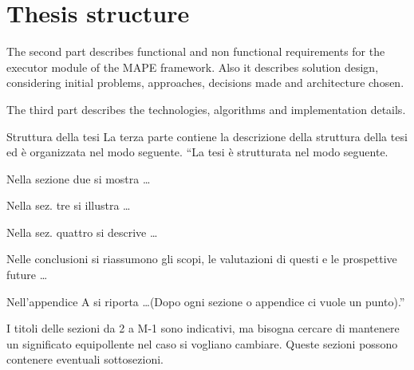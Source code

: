 \section{Thesis structure}
The second part describes functional and non functional requirements for the executor module of the MAPE framework.
Also it describes solution design, considering initial problems, approaches, decisions made and architecture chosen.

The third part describes the technologies, algorithms and implementation details.

\ifx 
{Struttura della tesi}
La terza parte contiene la descrizione della struttura della tesi ed \`e organizzata nel modo seguente.
``La tesi \`e strutturata nel modo seguente.

Nella sezione due si mostra \dots

Nella sez. tre si illustra \dots

Nella sez. quattro si descrive \dots

Nelle conclusioni si riassumono gli scopi, le valutazioni di questi e le prospettive future \dots

Nell'appendice A si riporta \dots (Dopo ogni sezione o appendice ci vuole un punto).''

I titoli delle sezioni da 2 a M-1 sono indicativi, ma bisogna cercare di mantenere un significato equipollente nel caso si vogliano cambiare. Queste sezioni possono contenere eventuali sottosezioni.
\fi